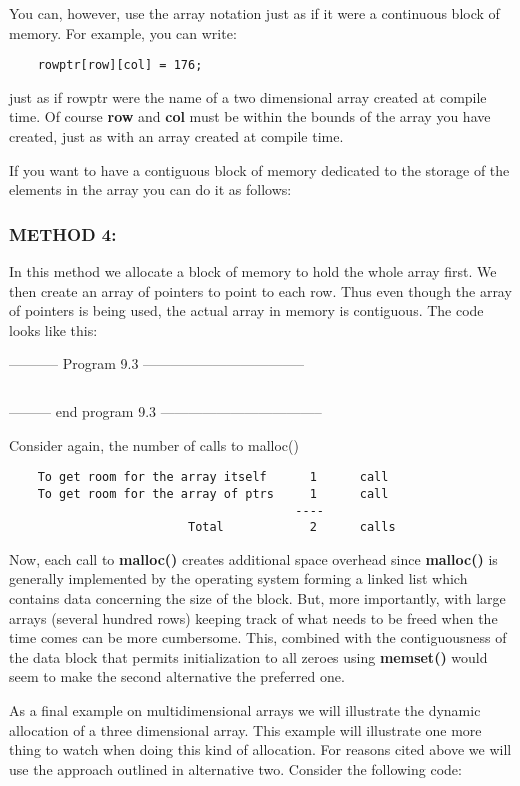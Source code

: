 You can, however, use the array notation just as if it were a continuous
block of memory. For example, you can write:

\begin{verbatim}
    rowptr[row][col] = 176;
\end{verbatim}

just as if rowptr were the name of a two dimensional array created at
compile time. Of course \textbf{row} and \textbf{col} must be within the
bounds of the array you have created, just as with an array created at
compile time.

If you want to have a contiguous block of memory dedicated to the
storage of the elements in the array you can do it as follows:

\hypertarget{method-4}{%
\subsubsection{METHOD 4:}\label{method-4}}

In this method we allocate a block of memory to hold the whole array
first. We then create an array of pointers to point to each row. Thus
even though the array of pointers is being used, the actual array in
memory is contiguous. The code looks like this:

-----------  Program 9.3  -----------------------------------
\inputminted{c}{../src/ch9-3.c}
--------- end program 9.3 -----------------------------------

Consider again, the number of calls to malloc()

\begin{verbatim}
    To get room for the array itself      1      call
    To get room for the array of ptrs     1      call
                                        ----
                         Total            2      calls
\end{verbatim}

Now, each call to \textbf{malloc()} creates additional space overhead
since \textbf{malloc()} is generally implemented by the operating system
forming a linked list which contains data concerning the size of the
block. But, more importantly, with large arrays (several hundred rows)
keeping track of what needs to be freed when the time comes can be more
cumbersome. This, combined with the contiguousness of the data block
that permits initialization to all zeroes using \textbf{memset()} would
seem to make the second alternative the preferred one.

As a final example on multidimensional arrays we will illustrate the
dynamic allocation of a three dimensional array. This example will
illustrate one more thing to watch when doing this kind of allocation.
For reasons cited above we will use the approach outlined in alternative
two. Consider the following code:

